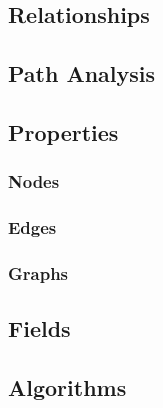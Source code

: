 \documentclass[a4paper,11pt]{report}
\begin{document}
                \lipsum[6-8]
                
            \subsection{Relationships}

                \lipsum[6-8]
                
            \subsection{Path Analysis}

                \lipsum[6-8]
                
            \subsection{Properties}

                \lipsum[6-8]
                
                \subsubsection{Nodes}
                
                    \lipsum[6-8]
                 
                \subsubsection{Edges}
                
                    \lipsum[6-8]
                
                \subsubsection{Graphs}
                
                    \lipsum[6-8]

            \subsection{Fields}

                \lipsum[6-8]
                
            \subsection{Algorithms}
\end{document}
